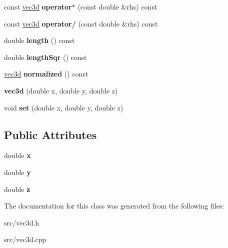 \begin{DoxyCompactItemize}
\item 
\hypertarget{classvec3d_a6a9985a79cd638a223bab07e7b573281}{
const \hyperlink{classvec3d}{vec3d} {\bfseries operator$\ast$} (const double \&rhs) const }
\label{classvec3d_a6a9985a79cd638a223bab07e7b573281}

\item 
\hypertarget{classvec3d_ac456ee32235beff53c01b4ff47389a44}{
const \hyperlink{classvec3d}{vec3d} {\bfseries operator/} (const double \&rhs) const }
\label{classvec3d_ac456ee32235beff53c01b4ff47389a44}

\item 
\hypertarget{classvec3d_a807888ce0ea880f9944099f1eff78136}{
double {\bfseries length} () const }
\label{classvec3d_a807888ce0ea880f9944099f1eff78136}

\item 
\hypertarget{classvec3d_a7e5011db2df0ff28e4af6e9fff5cccc2}{
double {\bfseries lengthSqr} () const }
\label{classvec3d_a7e5011db2df0ff28e4af6e9fff5cccc2}

\item 
\hypertarget{classvec3d_a2ba8348f5f54d8d0271a1363862ee41c}{
\hyperlink{classvec3d}{vec3d} {\bfseries normalized} () const }
\label{classvec3d_a2ba8348f5f54d8d0271a1363862ee41c}

\item 
\hypertarget{classvec3d_ac6275302b5bc9c13d6b41f3cba0b0596}{
{\bfseries vec3d} (double x, double y, double z)}
\label{classvec3d_ac6275302b5bc9c13d6b41f3cba0b0596}

\item 
\hypertarget{classvec3d_aa0a79e3983c6d8f94e7d129c3c7d1b72}{
void {\bfseries set} (double x, double y, double z)}
\label{classvec3d_aa0a79e3983c6d8f94e7d129c3c7d1b72}

\end{DoxyCompactItemize}
\subsection*{Public Attributes}
\begin{DoxyCompactItemize}
\item 
\hypertarget{classvec3d_a06cbd00203032f3ba256607c91a86224}{
double {\bfseries x}}
\label{classvec3d_a06cbd00203032f3ba256607c91a86224}

\item 
\hypertarget{classvec3d_ab9565b6172e518c63f098d4617fc8fa5}{
double {\bfseries y}}
\label{classvec3d_ab9565b6172e518c63f098d4617fc8fa5}

\item 
\hypertarget{classvec3d_a0797078838f3237dffa2dd3522e74403}{
double {\bfseries z}}
\label{classvec3d_a0797078838f3237dffa2dd3522e74403}

\end{DoxyCompactItemize}


The documentation for this class was generated from the following files:\begin{DoxyCompactItemize}
\item 
src/vec3d.h\item 
src/vec3d.cpp\end{DoxyCompactItemize}
